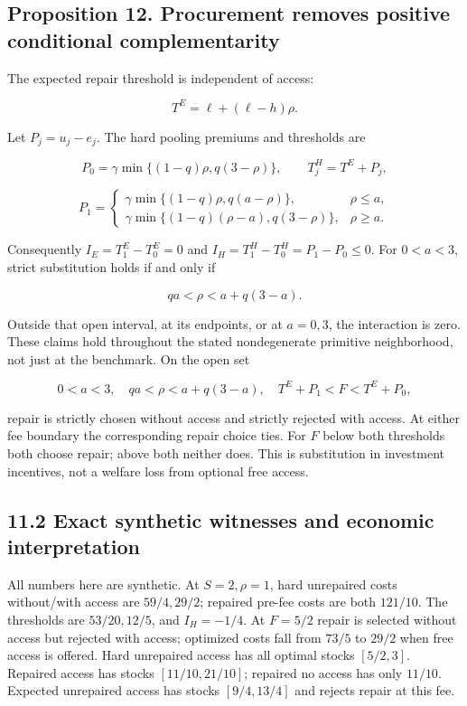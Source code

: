 \documentclass[
  11pt,
  a4paper,
]{article}
\begin{document}
\hypertarget{proposition-12.-procurement-removes-positive-conditional-complementarity}{%
\subsection{Proposition 12. Procurement removes positive conditional
complementarity}\label{proposition-12.-procurement-removes-positive-conditional-complementarity}}

The expected repair threshold is independent of access:

\[T^E=\ell+(\ell-h)\rho.\tag{60}\]

Let \(P_j=u_j-e_j\). The hard pooling premiums and thresholds are

\[P_0=\gamma\min\{(1-q)\rho,q(3-\rho)\},\qquad T^H_j=T^E+P_j,\tag{61}\]

\[P_1=\begin{cases}
\gamma\min\{(1-q)\rho,q(a-\rho)\},&\rho\leq a,\\
\gamma\min\{(1-q)(\rho-a),q(3-\rho)\},&\rho\geq a.
\end{cases}\tag{62}\]

Consequently \(I_E=T^E_1-T^E_0=0\) and \(I_H=T^H_1-T^H_0=P_1-P_0\leq0\).
For \(0<a<3\), strict substitution holds if and only if

\[qa<\rho<a+q(3-a).\tag{63}\]

Outside that open interval, at its endpoints, or at \(a=0,3\), the
interaction is zero. These claims hold throughout the stated
nondegenerate primitive neighborhood, not just at the benchmark. On the
open set

\[0<a<3,\quad qa<\rho<a+q(3-a),\quad T^E+P_1<F<T^E+P_0,\tag{64}\]

repair is strictly chosen without access and strictly rejected with
access. At either fee boundary the corresponding repair choice ties. For
\(F\) below both thresholds both choose repair; above both neither does.
This is substitution in investment incentives, not a welfare loss from
optional free access.

\hypertarget{exact-synthetic-witnesses-and-economic-interpretation}{%
\subsection{11.2 Exact synthetic witnesses and economic
interpretation}\label{exact-synthetic-witnesses-and-economic-interpretation}}

All numbers here are synthetic. At \(S=2,\rho=1\), hard unrepaired costs
without/with access are \(59/4,29/2\); repaired pre-fee costs are both
\(121/10\). The thresholds are \(53/20,12/5\), and \(I_H=-1/4\). At
\(F=5/2\) repair is selected without access but rejected with access;
optimized costs fall from \(73/5\) to \(29/2\) when free access is
offered. Hard unrepaired access has all optimal stocks \([5/2,3]\).
Repaired access has stocks \([11/10,21/10]\); repaired no access has
only \(11/10\). Expected unrepaired access has stocks \([9/4,13/4]\) and
rejects repair at this fee.
\end{document}
